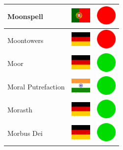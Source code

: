 \documentclass[12pt, a4paper, twoside]{report}
\begin{document}
\begin{center}
\begin{longtable}{|p{5cm}|p{2cm}|p{2cm}|}
 Moonspell                                                  & \includegraphics[width=1cm]{../4x3/pt} &   \includegraphics[width=1cm]{../likes/n} \\ \hline
 Moontowers                                                 & \includegraphics[width=1cm]{../4x3/de} &   \includegraphics[width=1cm]{../likes/n} \\ \hline
 Moor                                                       & \includegraphics[width=1cm]{../4x3/de} &   \includegraphics[width=1cm]{../likes/y} \\ \hline
 Moral Putrefaction                                         & \includegraphics[width=1cm]{../4x3/in} &   \includegraphics[width=1cm]{../likes/y} \\ \hline
 Morasth                                                    & \includegraphics[width=1cm]{../4x3/de} &   \includegraphics[width=1cm]{../likes/y} \\ \hline
 Morbus Dei                                                 & \includegraphics[width=1cm]{../4x3/de} &   \includegraphics[width=1cm]{../likes/y} \\ \hline

\end{longtable}
\end{center}
\end{document}
